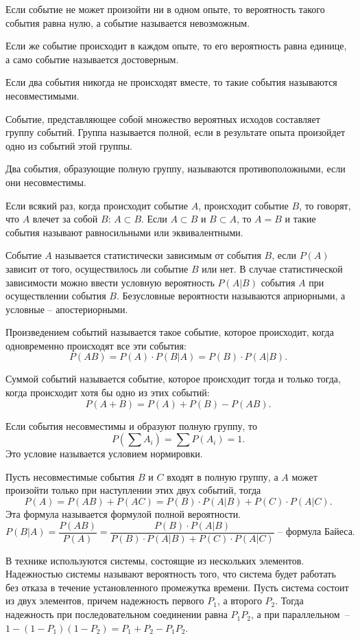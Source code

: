 Если событие не может произойти ни в одном опыте, то вероятность такого события
равна нулю, а событие называется невозможным.

Если же событие происходит в каждом опыте, то его вероятность равна единице, а
само событие называется достоверным.

Если два события никогда не происходят вместе, то такие события называются
несовместимыми.

Событие, представляющее собой множество вероятных исходов составляет группу
событий. Группа называется полной, если в результате опыта произойдет одно из
событий этой группы.

Два события, образующие полную группу, называются противоположными, если они
несовместимы.

Если всякий раз, когда происходит событие \( A \), происходит событие \( B \),
то говорят, что \( A \) влечет за собой \( B \): \( A \subset B \). Если
\( A \subset B \) и \( B \subset A \), то \( A = B \) и такие события называют
равносильными или эквивалентными.

Событие \( A \) называется статистически зависимым от события \( B \), если
\( P(A) \) зависит от того, осуществилось ли событие \( B \) или нет. В случае
статистической зависимости можно ввести условную вероятность \( P(A|B) \)
события \( A \) при осуществлении события \( B \). Безусловные вероятности
называются априорными, а условные -- апостериорными.

Произведением событий называется такое событие, которое происходит, когда
одновременно происходят все эти события:
\[
    P(AB) = P(A) \cdot P(B|A) = P(B) \cdot P(A|B).
\]

Суммой событий называется событие, которое происходит тогда и только тогда,
когда происходит хотя бы одно из этих событий:
\[
    P(A+B) = P(A) + P(B) - P(AB).
\]

Если события несовместимы и образуют полную группу, то
\[
    P\left(\sum A_i\right) = \sum P(A_i) = 1.
\]
Это условие называется условием нормировки.

Пусть несовместимые события \( B \) и \( C \) входят в полную группу, а \( A \)
может произойти только при наступлении этих двух событий, тогда
\[
    P(A) = P(AB) + P(AC) = P(B) \cdot P(A|B) + P(C) \cdot P(A|C).
\]
Эта формула называется формулой полной вероятности.
\[
    P(B|A) = \frac{P(AB)}{P(A)} = \frac{P(B) \cdot P(A|B)}
    {P(B) \cdot P(A|B) + P(C) \cdot P(A|C)} \text{ -- формула Байеса.}
\]

В технике используются системы, состоящие из нескольких элементов. Надежностью
системы называют вероятность того, что система будет работать без отказа в
течение установленного промежутка времени. Пусть система состоит из двух
элементов, причем надежность первого \( P_1 \), а второго \( P_2 \). Тогда
надежность при последовательном соединении равна \( P_1P_2 \),  а при
параллельном~--\\ \( 1 - (1 - P_1)(1 - P_2) = P_1 + P_2 - P_1P_2 \).

